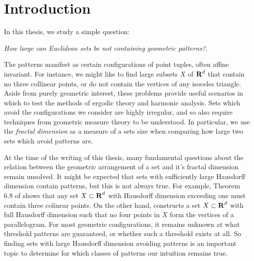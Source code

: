 
\chapter{Introduction}
\label{ch:Introduction}

In this thesis, we study a simple question:
%
\begin{center}
	{\it How large can Euclidean sets be not containing geometric patterns?}.
\end{center}
%
The patterns manifest as certain configurations of point tuples, often affine invariant. For instance, we might like to find large subsets $X$ of $\operatorname{\mathbf{R}}^d$ that contain no three collinear points, or do not contain the vertices of any isoceles triangle. Aside from purely geometric interest, these problems provide useful scenarios in which to test the methods of ergodic theory and harmonic analysis. Sets which avoid the configurations we consider are highly irregular, and so also require techniques from geometric measure theory to be understood. In particular, we use the \emph{fractal dimension} as a measure of a sets size when comparing how large two sets which avoid patterns are.



At the time of the writing of this thesis, many fundamental questions about the relation between the geometric arrangement of a set and it's fractal dimension remain unsolved. It might be expected that sets with sufficiently large Hausdorff dimension contain patterns, but this is not always true. For example, Theorem 6.8 of \cite{Matilla} shows that any set $X \subset \operatorname{\mathbf{R}}^d$ with Hausdorff dimension exceeding one must contain three colinear points. On the other hand, \cite{Maga} constructs a set $X \subset \operatorname{\mathbf{R}}^d$ with full Hausdorff dimension such that no four points in $X$ form the vertices of a parallelogram. For most geometric configurations, it remains unknown at what threshold patterns are guaranteed, or whether such a threshold exists at all. So finding sets with large Hausdorff dimension avoiding patterns is an important topic to determine for which classes of patterns our intuition remains true.


